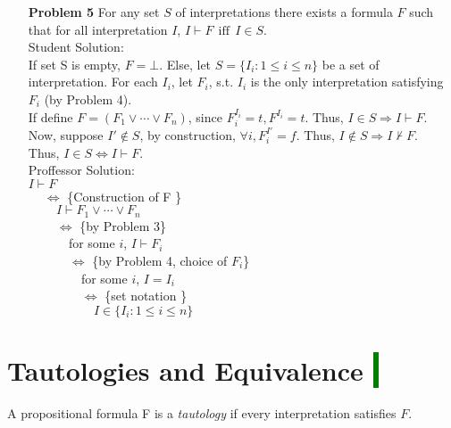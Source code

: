 \documentclass[12pt]{article}
\begin{document}
\begin{enumerate}
\item[\textbf{Problem 5}] For any set $S$ of interpretations there exists a formula $F$ such that for all interpretation $I$, $I \vdash F ~~\text{iff}~~ I \in S$. \\
Student Solution: \\
If set S is empty, $F = \bot$. Else, let $S = \{ I_i :1 \leq i \leq n \}$ be a set of interpretation. For each $I_i$, let $F_i$, s.t. $I_i$ is the only interpretation satisfying $F_i$ (by Problem 4).  \\
If define $F = (F_1 \vee \cdots \vee F_n)$, since $F_i^{I_i} = t, F^{I_i} = t$. Thus, $I \in S \Rightarrow I \vdash F$. \\
Now, suppose $I' \notin S$, by construction, $\forall i, F_i^{I'} = f$. Thus,  $I \notin S \Rightarrow I \not\vdash F$. \\
Thus, $I \in S \iff I \vdash F$.\\

Proffessor Solution: \\
$I \vdash F$ \\
$~\quad \iff$  \{Construction of F \}\\
    $~\qquad I \vdash F_1 \vee \cdots \vee F_n $  \\
$~\qquad \iff$   \{by Problem 3\}  \\ 
    $~\qquad \quad$for some $i$, $I \vdash F_i$  \\
 $~\qquad \quad \iff$   \{by Problem 4, choice of $F_i$\}  \\ 
    $~\qquad \qquad$for some $i$, $I = I_i$  \\
 $~\qquad \qquad \iff$   \{set notation \}  \\ 
 $~\qquad \qquad \quad I \in \{  I_i :1 \leq i \leq n\}$   \\ 

\end{enumerate}

\section{Tautologies and Equivalence \colorbox{green}{$~$ }}
A propositional formula F is a \textit{tautology} if every interpretation satisfies $F$.
\end{document}
